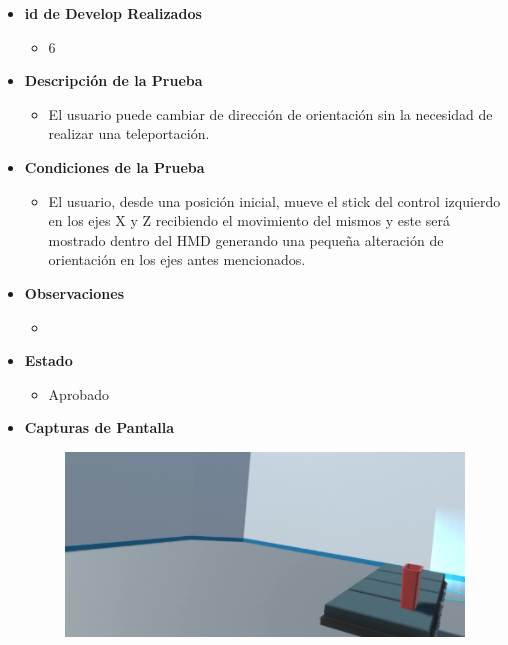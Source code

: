 \begin{itemize}
    \item \textbf{id de Develop Realizados}
    \begin{itemize}
        \item 6
    \end{itemize}
    \item \textbf{Descripción de la Prueba}
    \begin{itemize}
        \item El usuario puede cambiar de dirección de orientación sin la necesidad de realizar una teleportación.
    \end{itemize}
    \item \textbf{Condiciones de la Prueba}
    \begin{itemize}
        \item El usuario, desde una posición inicial, mueve el stick del control izquierdo en los ejes X y Z recibiendo el movimiento del mismos y este será mostrado dentro del HMD generando una pequeña alteración de orientación en los ejes antes mencionados.
    \end{itemize}
    \item \textbf{Observaciones}
    \begin{itemize}
        \item 
    \end{itemize}
    \item \textbf{Estado}
    \begin{itemize}
        \item Aprobado
    \end{itemize}
    \item \textbf{Capturas de Pantalla}
    \begin{figure}[H]
       	\begin{center}
       		\includegraphics[width = .7\textwidth]{source/images/image66.png}
       	\end{center} 
    \end{figure}


\end{itemize}
